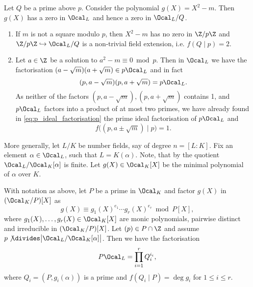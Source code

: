 Let \( Q \) be a prime above \( p \). Consider the polynomial \( g(X) = X^2 - m \).
Then \( g(X) \) has a zero in \( \Ocal_L \) and hence a zero in \( \Ocal_L/Q \).

\begin{enumerate}
	\item If \( m \) is not a square modulo \( p \), then \( X^2 - m \) has no zero in \( \Z/p\Z \) and \( \Z/p\Z \hookrightarrow \Ocal_L/Q \) is a non-trivial field extension, i.e. \( f(Q \mid p) = 2 \).
	\item Let \( a \in \Z \) be a solution to \( a^2-m \equiv 0 \bmod p \).
		Then in \( \Ocal_L \) we have the factorisation \( (a - \sqrt{m}) (a + \sqrt{m}) \in p\Ocal_L \) and in fact
		\begin{equation}\label{eq:p_ideal_factorisation}
			(p, a - \sqrt{m}) (p, a + \sqrt{m}) = p\Ocal_L.
		\end{equation}
		As neither of the factors \( (p, a - \sqrt{m}), (p, a + \sqrt{m}) \) contains 1, and \( p\Ocal_L \) factors into a product of at most two primes, we have already found in \eqref{eq:p_ideal_factorisation} the prime ideal factorisation of \( p\Ocal_L \) and 
		\[ f\big( (p, a \pm \sqrt{m}) \mid p \big) = 1. \]
\end{enumerate}

More generally, let \( L/K \) be number fields, say of degree \( n = [L:K] \).
Fix an element \( \alpha \in \Ocal_L \), such that \( L = K(\alpha) \).
Note, that by  the quotient \( \Ocal_L/\Ocal_K[\alpha] \) is finite.
Let \( g(X) \in \Ocal_K[X] \) be the minimal polynomial of \( \alpha \) over \( K \).

\begin{thmn}\label{thm:2.22}
	With notation as above, let \( P \) be a prime in \( \Ocal_K \) and factor \( g(X) \) in \( (\Ocal_K/P) [X] \) as
	\[ g(X) \equiv g_1(X)^{e_1} \dotsm g_r(X)^{e_r} \bmod P[X], \]
	where \( g_1(X), \dotsc, g_r(X) \in \Ocal_K[X] \) are monic polynomials, pairwise distinct and irreducible in \( (\Ocal_K/P)[X] \).
	Let \( (p) \in P \cap \Z \) and assume \( p \not\divides \big| \Ocal_L / \Ocal_K[\alpha] \big| \).
	Then we have the factorisation
	\[ P\Ocal_L = \prod_{i=1}^{r} Q_i^{i_i}, \]
	where \( Q_i = (P, g_i(\alpha)) \) is a prime and \( f(Q_i \mid P) = \deg g_i \) for \( 1 \leq i \leq r \).
\end{thmn}